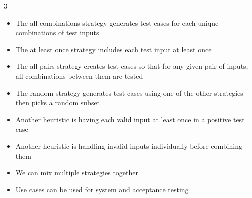 \documentclass[10pt, landscape]{article}
\begin{document}
\begin{multicols*}{3}
\begin{itemize}
    \item The all combinations strategy generates test cases for each unique combinations of test inputs
    \item The at least once strategy includes each test input at least once
    \item The all pairs strategy creates test cases so that for any given pair of inputs, all combinations between them are tested
    \item The random strategy generates test cases using one of the other strategies then picks a random subset
    \item Another heuristic is having each valid input at least once in a positive test case
    \item Another heuristic is handling invalid inputs individually before combining them
    \item We can mix multiple strategies together
    \item Use cases can be used for system and acceptance testing
\end{itemize}


\end{multicols*}
\end{document}
